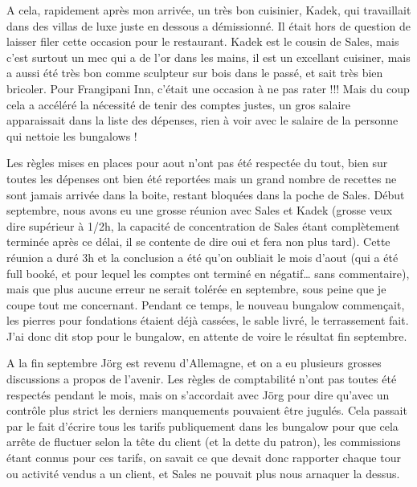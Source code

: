 \par
A cela, rapidement après mon arrivée, un très bon cuisinier, Kadek, qui travaillait dans des villas de luxe juste en dessous a démissionné. Il était hors de question de laisser filer cette occasion pour le restaurant. Kadek est le cousin de Sales, mais c’est surtout un mec qui a de l’or dans les mains, il est un excellant cuisiner, mais a aussi été très bon comme sculpteur sur bois dans le passé, et sait très bien bricoler. Pour Frangipani Inn, c’était une occasion à ne pas rater !!! Mais du coup cela a accéléré la nécessité de tenir des comptes justes, un gros salaire apparaissait dans la liste des dépenses, rien à voir avec le salaire de la personne qui nettoie les bungalows !

\par
Les règles mises en places pour aout n’ont pas été respectée du tout, bien sur toutes les dépenses ont bien été reportées mais un grand nombre de recettes ne sont jamais arrivée dans la boite, restant bloquées dans la poche de Sales. Début septembre, nous avons eu une grosse réunion avec Sales et Kadek (grosse veux dire supérieur à 1/2h, la capacité de concentration de Sales étant complètement terminée après ce délai, il se contente de dire oui et fera non plus tard). Cette réunion a duré 3h et la conclusion a été qu’on oubliait le mois d’aout (qui a été full booké, et pour lequel les comptes ont terminé en négatif… sans commentaire), mais que plus aucune erreur ne serait tolérée en septembre, sous peine que je coupe tout me concernant. Pendant ce temps, le nouveau bungalow commençait, les pierres pour fondations étaient déjà cassées, le sable livré, le terrassement fait. J’ai donc dit stop pour le bungalow, en attente de voire le résultat fin septembre.

\par
A la fin septembre Jörg est revenu d’Allemagne, et on a eu plusieurs grosses discussions a propos de l’avenir. Les règles de comptabilité n’ont pas toutes été respectés pendant le mois, mais on s’accordait avec Jörg pour dire qu’avec un contrôle plus strict les derniers manquements pouvaient être jugulés. Cela passait par le fait d’écrire tous les tarifs publiquement dans les bungalow pour que cela arrête de fluctuer selon la tête du client (et la dette du patron), les commissions étant connus pour ces tarifs, on savait ce que devait donc rapporter chaque tour ou activité vendus a un client, et Sales ne pouvait plus nous arnaquer la dessus.

